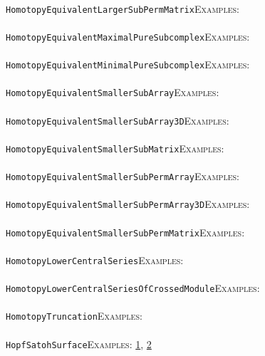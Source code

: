 \documentclass[a4paper,11pt]{report}
\begin{document}
{{ \\
 \texttt{HomotopyEquivalentLargerSubPermMatrix}{\nobreakspace}{\nobreakspace}{\nobreakspace}{\nobreakspace}\textsc{Examples:} \\
 \\
 \texttt{HomotopyEquivalentMaximalPureSubcomplex}{\nobreakspace}{\nobreakspace}{\nobreakspace}{\nobreakspace}\textsc{Examples:} \\
 \\
 \texttt{HomotopyEquivalentMinimalPureSubcomplex}{\nobreakspace}{\nobreakspace}{\nobreakspace}{\nobreakspace}\textsc{Examples:} \\
 \\
 \texttt{HomotopyEquivalentSmallerSubArray}{\nobreakspace}{\nobreakspace}{\nobreakspace}{\nobreakspace}\textsc{Examples:} \\
 \\
 \texttt{HomotopyEquivalentSmallerSubArray3D}{\nobreakspace}{\nobreakspace}{\nobreakspace}{\nobreakspace}\textsc{Examples:} \\
 \\
 \texttt{HomotopyEquivalentSmallerSubMatrix}{\nobreakspace}{\nobreakspace}{\nobreakspace}{\nobreakspace}\textsc{Examples:} \\
 \\
 \texttt{HomotopyEquivalentSmallerSubPermArray}{\nobreakspace}{\nobreakspace}{\nobreakspace}{\nobreakspace}\textsc{Examples:} \\
 \\
 \texttt{HomotopyEquivalentSmallerSubPermArray3D}{\nobreakspace}{\nobreakspace}{\nobreakspace}{\nobreakspace}\textsc{Examples:} \\
 \\
 \texttt{HomotopyEquivalentSmallerSubPermMatrix}{\nobreakspace}{\nobreakspace}{\nobreakspace}{\nobreakspace}\textsc{Examples:} \\
 \\
 \texttt{HomotopyLowerCentralSeries}{\nobreakspace}{\nobreakspace}{\nobreakspace}{\nobreakspace}\textsc{Examples:} \\
 \\
 \texttt{HomotopyLowerCentralSeriesOfCrossedModule}{\nobreakspace}{\nobreakspace}{\nobreakspace}{\nobreakspace}\textsc{Examples:} \\
 \\
 \texttt{HomotopyTruncation}{\nobreakspace}{\nobreakspace}{\nobreakspace}{\nobreakspace}\textsc{Examples:} \\
 \\
 \texttt{HopfSatohSurface}{\nobreakspace}{\nobreakspace}{\nobreakspace}{\nobreakspace}\textsc{Examples:} \href{tutorial/chap3.html} {1}{\nobreakspace}, \href{../www/SideLinks/About/aboutCoverinSpaces.html} {2}{\nobreakspace} \\
}}
\end{document}
